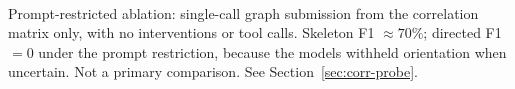 \begin{table}[t]
\vspace{2pt}
\begin{flushleft}
\footnotesize
\textsuperscript{\dag}Prompt-restricted ablation: single-call graph submission
from the correlation matrix only, with no interventions or tool calls.
Skeleton F1 $\approx 70\%$; directed F1 $= 0$ under the prompt restriction,
because the models withheld orientation when uncertain.
Not a primary comparison. See Section~\ref{sec:corr-probe}.
\end{flushleft}
\end{table}
